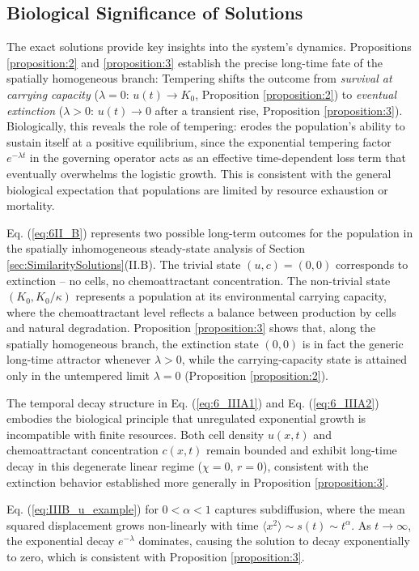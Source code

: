 \documentclass{article}
\begin{document}
\subsection{Biological Significance of Solutions}
\par 
The exact solutions provide key insights into the system's dynamics. Propositions \ref{proposition:2} and \ref{proposition:3} establish the precise long-time fate of the spatially homogeneous branch: Tempering shifts the outcome from \textit{survival at carrying capacity} ($\lambda=0$: $u(t)\to K_0$, Proposition \ref{proposition:2}) to \textit{eventual extinction} ($\lambda>0$: $u(t)\to0$ after a transient rise, Proposition \ref{proposition:3}). Biologically, this reveals the role of tempering: erodes the population's ability to sustain itself at a positive equilibrium, since the exponential tempering factor $e^{-\lambda t}$ in the governing operator acts as an effective time-dependent loss term that eventually overwhelms the logistic growth. This is consistent with the general biological expectation that populations are limited by resource exhaustion or mortality.
\par 
Eq. (\ref{eq:6II_B}) represents two possible long-term outcomes for the population in the spatially inhomogeneous steady-state analysis of Section \ref{sec:SimilaritySolutions}(II.B). The trivial state $(u,c)=(0,0)$ corresponds to extinction -- no cells, no chemoattractant concentration. The non-trivial state $(K_0, K_0/\kappa)$ represents a population at its environmental carrying capacity, where the chemoattractant level reflects a balance between production by cells and natural degradation. Proposition \ref{proposition:3} shows that, along the spatially homogeneous branch, the extinction state $(0,0)$ is in fact the generic long-time attractor whenever $\lambda>0$, while the carrying-capacity state is attained only in the untempered limit $\lambda=0$ (Proposition \ref{proposition:2}).
\par 
The temporal decay structure in Eq. (\ref{eq:6_IIIA1}) and Eq. (\ref{eq:6_IIIA2}) embodies the biological principle that unregulated exponential growth is incompatible with finite resources. Both cell density $u(x,t)$ and chemoattractant concentration $c(x,t)$ remain bounded and exhibit long-time decay in this degenerate linear regime ($\chi=0$, $r=0$), consistent with the extinction behavior established more generally in Proposition \ref{proposition:3}.
\par 
Eq. (\ref{eq:IIIB_u_example}) for $0<\alpha <1$ captures subdiffusion, where the mean squared displacement grows non-linearly with time $\langle x^2 \rangle \sim s(t) \sim t^\alpha $. As $t\rightarrow\infty$, the exponential decay $e^{-\lambda}$ dominates, causing the solution to decay exponentially to zero, which is consistent with Proposition \ref{proposition:3}.
\end{document}
